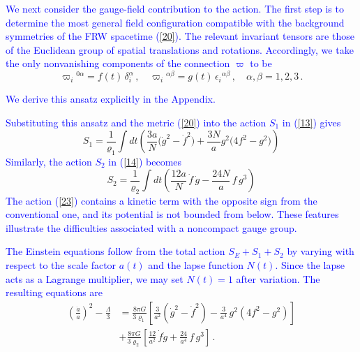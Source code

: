 \documentclass [prd,reprint,eqsecnum,nofootinbib]  {revtex4-1}
\newcommand{\corr}[1]{\textcolor{blue}{#1}}
\begin{document}
\corr{We next consider the gauge-field contribution to the action.
The first step is to determine the most general field configuration
compatible with the background symmetries of the FRW spacetime
(\ref{20}). The relevant invariant tensors are those of the
Euclidean group of spatial translations and rotations. Accordingly,
we take the only nonvanishing components of the connection
$\varpi$ to be}
\begin{equation}\label{22}

    \varpi_i{}^{0\alpha} = f(t)\, \delta_i^\alpha\,,

    \quad \varpi_i{}^{\alpha\beta} = g(t)\,

    \epsilon_i{}^{\alpha\beta}\,,\quad \alpha,\beta=1,2,3\,.

\end{equation}

\corr{We derive this ansatz explicitly in the Appendix.}



\corr{Substituting this ansatz and the metric (\ref{20}) into the
action $S_1$ in (\ref{13}) gives}
\begin{equation}
    S_1 =\frac1{\varrho_1}\int dt \left( \frac{3a}{N}\Big(\dot{g}^2 -\dot{f}^2\Big)
+ \frac{3N}{a} g^2\Big(4f^2-g^2\Big) \right)\label{23}
\end{equation}
\corr{Similarly, the action $S_2$ in (\ref{14}) becomes}
\begin{equation}
    S_2 =\frac1{\varrho_2}\int dt \left( \frac{12a}{N}\, \dot f\,\dot g - \frac{24N}{a}\, f\, g^3\right)\label{24}
\end{equation}
\corr{The action (\ref{23}) contains a kinetic term with the
opposite sign from the conventional one, and its potential is not
bounded from below. These features illustrate the difficulties
associated with a noncompact gauge group.}

\corr{The Einstein equations follow from the total action
$S_E+S_1+S_2$ by varying with respect to the scale factor $a(t)$
and the lapse function $N(t)$. Since the lapse acts as a Lagrange
multiplier, we may set $N(t)=1$ after variation. The resulting
equations are}
\begin{align}

\left(\frac{\dot{a}}{a} \right)^2-\frac{\Lambda}{3}

 &=\frac{8\pi G}{3\varrho_1}\left[\frac{3}{a^2} \left(\dot g^2 - \dot

 f^2\right)

 -\frac{3}{a^4}\,g^2\left(4f^2-g^2\right)\right]\nonumber\\

 &+\frac{8\pi G}{3\varrho_2}\left[\frac{12}{a^2}\, \dot f \dot g +\frac{24}{a^4}\,f\, g^3\right]\,.\label{25}

\end{align}
\end{document}
